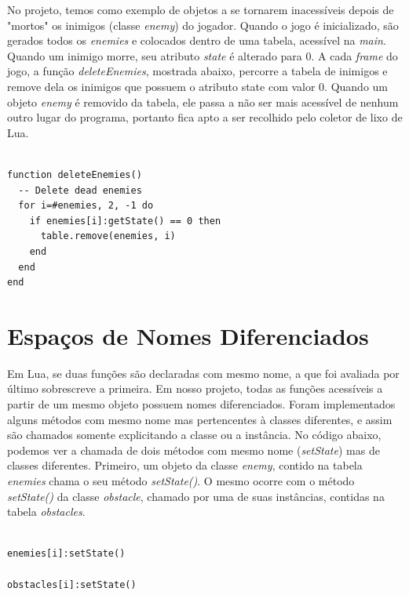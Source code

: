 \documentclass[rel_mlp]{iiufrgs}
\begin{document}
No projeto, temos como exemplo de objetos a se tornarem inacessíveis depois de "mortos" os inimigos (classe \textit{enemy}) do jogador. Quando o jogo é inicializado, são gerados todos os \textit{enemies} e colocados dentro de uma tabela, acessível na \textit{main}. Quando um inimigo morre, seu atributo \textit{state} é alterado para 0. A cada \textit{frame} do jogo, a função \textit{deleteEnemies}, mostrada abaixo, percorre a tabela de inimigos e remove dela os inimigos que possuem o atributo state com valor 0. Quando um objeto \textit{enemy} é removido da tabela, ele passa a não ser mais acessível de nenhum outro lugar do programa, portanto fica apto a ser recolhido pelo coletor de lixo de Lua.

\clearpage

\begin{lstlisting}

function deleteEnemies()
  -- Delete dead enemies
  for i=#enemies, 2, -1 do
    if enemies[i]:getState() == 0 then
      table.remove(enemies, i)
    end
  end
end

\end{lstlisting}


\section{Espaços de Nomes Diferenciados} \label{Espaço}

Em Lua, se duas funções são declaradas com mesmo nome, a que foi avaliada por último sobrescreve a primeira. Em nosso projeto, todas as funções acessíveis a partir de um mesmo objeto possuem nomes diferenciados. Foram implementados alguns métodos com mesmo nome mas pertencentes à classes diferentes, e assim são chamados somente explicitando a classe ou a instância. No código abaixo, podemos ver a chamada de dois métodos com mesmo nome (\textit{setState}) mas de classes diferentes. Primeiro, um objeto da classe \textit{enemy}, contido na tabela \textit{enemies} chama o seu método \textit{setState()}. O mesmo ocorre com o método \textit{setState()} da classe \textit{obstacle}, chamado por uma de suas instâncias, contidas na tabela \textit{obstacles}.

\begin{lstlisting}

enemies[i]:setState()

obstacles[i]:setState()

\end{lstlisting}
\end{document}
